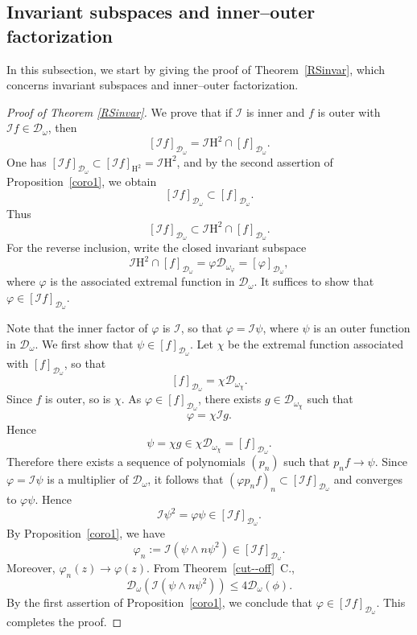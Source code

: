 \documentclass[12pt,reqno,a4paper]{amsart}
\newcommand{\hH}{\mathrm{H^2 }}
\newcommand{\cD}{{\mathcal{D}}}
\numberwithin{equation}{section}
\begin{document}
	\subsection{Invariant subspaces and inner--outer factorization}\label{inner--outer factorization}
	
	In this subsection, we start by giving the proof of Theorem~\ref{RSinvar}, which concerns invariant subspaces and inner--outer factorization.
	\begin{proof}[Proof of Theorem \ref{RSinvar}]
		We prove that if $\mathcal{I}$ is inner and $f$ is outer with $\mathcal{I}f \in \cD_\omega$, then
		\[
		[\mathcal{I}f]_{\cD_\omega} = \mathcal{I} \hH \cap [f]_{\cD_\omega}.
		\]
		One has $[\mathcal{I}f]_{\cD_\omega} \subset [\mathcal{I}f]_{\hH} = \mathcal{I} \hH$, and by the second assertion of Proposition~\ref{coro1},  we obtain
		\[
		[\mathcal{I}f]_{\cD_\omega} \subset [f]_{\cD_\omega}.
		\]
		Thus
		\[
		[\mathcal{I}f]_{\cD_\omega} \subset \mathcal{I} \hH \cap [f]_{\cD_\omega}.
		\]
		For the reverse inclusion, write the closed invariant subspace
		\[
		\mathcal{I} \hH \cap [f]_{\cD_\omega} = \varphi \cD_{\omega_\varphi} = [\varphi]_{\cD_\omega},
		\]
		where $\varphi$ is the associated extremal function in $\cD_\omega$. It suffices to show that $\varphi \in [\mathcal{I}f]_{\cD_\omega}$.
		
		Note that the inner factor of $\varphi$ is $\mathcal{I}$, so that $\varphi = \mathcal{I}\psi$, where $\psi$ is an outer function in $\cD_\omega$. We first show that $\psi \in [f]_{\cD_\omega}$. Let $\chi$ be the extremal function associated with $[f]_{\cD_\omega}$, so that
		\[
		[f]_{\cD_\omega} = \chi \cD_{\omega_\chi}.
		\]
		Since $f$ is outer, so is $\chi$. As $\varphi \in [f]_{\cD_\omega}$, there exists $g \in \cD_{\omega_\chi}$ such that
		\[
		\varphi = \chi \mathcal{I} g.
		\]
		Hence
		\[
		\psi = \chi g \in \chi \cD_{\omega_\chi} = [f]_{\cD_\omega}.
		\]
		Therefore there exists a sequence of polynomials $(p_n)$ such that $p_n f \to \psi$. Since $\varphi = \mathcal{I}\psi$ is a multiplier of $\cD_\omega$, it follows that $(\varphi p_n f)_n \subset [\mathcal{I}f]_{\cD_\omega}$ and converges to $\varphi \psi$. Hence
		\[
		\mathcal{I} \psi^2 = \varphi \psi \in [\mathcal{I}f]_{\cD_\omega}.
		\]
		By Proposition~\ref{coro1}, we have
		\[
		\varphi_n := \mathcal{I}(\psi \wedge n\psi^2) \in [\mathcal{I}f]_{\cD_\omega}.
		\]
		Moreover, $\varphi_n(z) \to \varphi(z)$. From  Theorem~\ref{cut--off}~C.,
		\[
		\cD_\omega(\mathcal{I}(\psi \wedge n\psi^2)) \leq 4\cD_\omega(\phi).
		\]
		By the first assertion of Proposition~\ref{coro1}, we conclude that $\varphi \in [\mathcal{I}f]_{\cD_\omega}$. This completes the proof.
	\end{proof}
	
\end{document}
